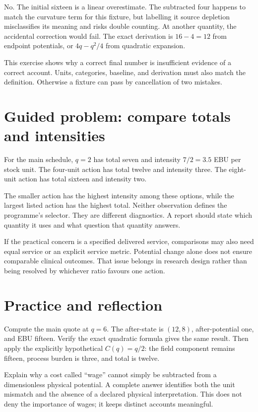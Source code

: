 No. The initial sixteen is a linear overestimate. The subtracted four happens to match the curvature term for this fixture, but labelling it source depletion misclassifies its meaning and risks double counting. At another quantity, the accidental correction would fail. The exact derivation is \(16-4=12\) from endpoint potentials, or \(4q-q^2/4\) from quadratic expansion.

This exercise shows why a correct final number is insufficient evidence of a correct account. Units, categories, baseline, and derivation must also match the definition. Otherwise a fixture can pass by cancellation of two mistakes.

\section{Guided problem: compare totals and intensities}
For the main schedule, \(q=2\) has total seven and intensity \(7/2=3.5\) EBU per stock unit. The four-unit action has total twelve and intensity three. The eight-unit action has total sixteen and intensity two.

The smaller action has the highest intensity among these options, while the largest listed action has the highest total. Neither observation defines the programme's selector. They are different diagnostics. A report should state which quantity it uses and what question that quantity answers.

If the practical concern is a specified delivered service, comparisons may also need equal service or an explicit service metric. Potential change alone does not ensure comparable clinical outcomes. That issue belongs in research design rather than being resolved by whichever ratio favours one action.

\section{Practice and reflection}
Compute the main quote at \(q=6\). The after-state is \((12,8)\), after-potential one, and EBU fifteen. Verify the exact quadratic formula gives the same result. Then apply the explicitly hypothetical \(C(q)=q/2\): the field component remains fifteen, process burden is three, and total is twelve.

Explain why a cost called ``wage'' cannot simply be subtracted from a dimensionless physical potential. A complete answer identifies both the unit mismatch and the absence of a declared physical interpretation. This does not deny the importance of wages; it keeps distinct accounts meaningful.

